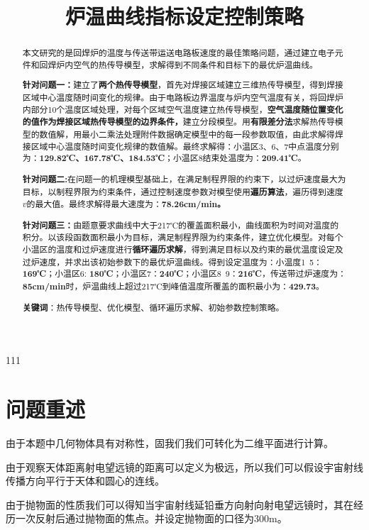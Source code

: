 \documentclass[withoutpreface,bwprint]{cumcmthesis} %
\title{炉温曲线指标设定控制策略}
\numberwithin{equation}{subsection}
\begin{document}
111
 \maketitle
 \begin{abstract}
本文研究的是回焊炉的温度与传送带运送电路板速度的最佳策略问题，通过建立电子元件和回焊炉内空气的热传导模型，求解得到不同条件和目标下的最优炉温曲线。

\textbf{针对问题一：}建立了\textbf{两个热传导模型}，首先对焊接区域建立三维热传导模型，得到焊接区域中心温度随时间变化的规律。由于电路板边界温度与炉内空气温度有关，将回焊炉内部分10个温度区域处理，对每个区域空气温度建立热传导模型，\textbf{空气温度随位置变化的值作为焊接区域热传导模型的边界条件，}建立分段模型。用\textbf{有限差分法}求解热传导模型的数值解，用最小二乘法处理附件数据确定模型中的每一段参数取值，由此求解得焊接区域中心温度随时间变化规律的数值解。最终求解得：小温区3、6、7中点温度分别为：\textbf{129.82℃、167.78℃、184.53℃}；小温区8结束处温度为：\textbf{209.41℃}。

\textbf{针对问题二:}在问题一的机理模型基础上，在满足制程界限的约束下，以过炉速度最大为目标，以制程界限为约束条件，通过控制速度参数对模型使用\textbf{遍历算法}，遍历得到速度$v$的最大值。最终求解得最大速度为：\textbf{78.26cm/min。}

\textbf{针对问题三：}由题意要求曲线中大于217℃的覆盖面积最小，曲线面积为时间对温度的积分。以该段函数面积最小为目标，满足制程界限为约束条件，建立优化模型。对每个小温区的温度和过炉速度进行\textbf{循环遍历求解}，得到满足目标以及约束的最优温度设定及过炉速度，并求出该初始参数下的最优炉温曲线。得到设定温度为：小温度1~5：\textbf{169℃}；小温区6: \textbf{180℃}；小温区7：\textbf{240℃}；小温区8~9：\textbf{216℃}，传送带过炉速度为：\textbf{85cm/min}时，炉温曲线上超过217℃到峰值温度所覆盖的面积最小为：\textbf{429.73}。


\textbf{关键词}：热传导模型、优化模型、循环遍历求解、初始参数控制策略。
\end{abstract}





\section{问题重述}

由于本题中几何物体具有对称性，固我们我们可转化为二维平面进行计算。

由于观察天体距离射电望远镜的距离可以定义为极远，所以我们可以假设宇宙射线传播方向平行于天体和圆心的连线。

由于抛物面的性质我们可以得知当宇宙射线延铅垂方向射向射电望远镜时，其在经历一次反射后通过抛物面的焦点。并设定抛物面的口径为300m。
\end{document}
